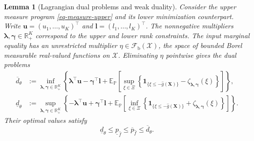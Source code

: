 \documentclass[review,11pt,3p,authoryear,nopreprintline]{elsarticle}
\newtheorem{lemma}{Lemma}
\begin{document}
\begin{lemma}[Lagrangian dual problems and weak duality]
  \label{lem-weak-duality}
  Consider the upper measure program \eqref{eq-measure-upper} and its lower minimization counterpart. Write $\bm u=(u_1,\ldots,u_K)^\top$ and $\bm l=(l_1,\ldots,l_K)^\top$. The nonnegative multipliers $\bm\lambda,\bm\gamma\in\mathbb R_+^K$ correspond to the upper and lower rank constraints. The input marginal equality has an unrestricted multiplier $\eta\in\mathcal F_{\mathrm b}(\mathcal X)$, the space of bounded Borel measurable real-valued functions on $\mathcal X$. Eliminating $\eta$ pointwise gives the dual problems
  \begin{align}
    \overline d_\theta
    &:=\inf_{\bm\lambda,\bm\gamma\in\mathbb R_+^K}
    \left\{\bm\lambda^\top\bm u-\bm\gamma^\top\bm l
    +\mathbb E_{\mathbb P}\left[\sup_{\xi\in\Xi}\left\{
    \mathbf1_{\{\xi\le-\hat g(\bm X)\}}
    -\zeta_{\bm\lambda,\bm\gamma}(\xi)
    \right\}\right]\right\},
    \label{eq-upper-measure-dual}\\
    \underline d_\theta
    &:=\sup_{\bm\lambda,\bm\gamma\in\mathbb R_+^K}
    \left\{-\bm\lambda^\top\bm u+\bm\gamma^\top\bm l
    +\mathbb E_{\mathbb P}\left[\inf_{\xi\in\Xi}\left\{
    \mathbf1_{\{\xi\le-\hat g(\bm X)\}}
    +\zeta_{\bm\lambda,\bm\gamma}(\xi)
    \right\}\right]\right\}.
    \label{eq-lower-measure-dual}
  \end{align}
  Their optimal values satisfy
  \begin{equation}
    \underline d_\theta\le\underline p_{\hat f}
    \le\overline p_{\hat f}\le\overline d_\theta.
    \label{eq-weak-duality}
  \end{equation}
\end{lemma}
\end{document}
